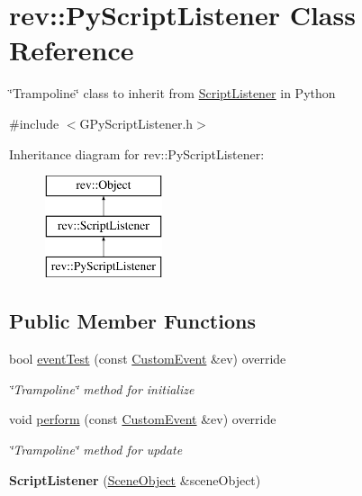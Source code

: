 \hypertarget{classrev_1_1_py_script_listener}{}\section{rev\+::Py\+Script\+Listener Class Reference}
\label{classrev_1_1_py_script_listener}


\char`\"{}\+Trampoline\char`\"{} class to inherit from \mbox{\hyperlink{classrev_1_1_script_listener}{Script\+Listener}} in Python  




{\ttfamily \#include $<$G\+Py\+Script\+Listener.\+h$>$}

Inheritance diagram for rev\+::Py\+Script\+Listener\+:\begin{figure}[H]
\begin{center}
\leavevmode
\includegraphics[height=3.000000cm]{classrev_1_1_py_script_listener}
\end{center}
\end{figure}
\subsection*{Public Member Functions}
\begin{DoxyCompactItemize}
\item 
\mbox{\label{classrev_1_1_py_script_listener_a932749a5461eba4df260c7db1c7f5199}} 
bool \mbox{\hyperlink{classrev_1_1_py_script_listener_a932749a5461eba4df260c7db1c7f5199}{event\+Test}} (const \mbox{\hyperlink{classrev_1_1_custom_event}{Custom\+Event}} \&ev) override
\begin{DoxyCompactList}\small\item\em \char`\"{}\+Trampoline\char`\"{} method for initialize \end{DoxyCompactList}\item 
\mbox{\label{classrev_1_1_py_script_listener_aac70b3c5ae016109bc4e632edd720345}} 
void \mbox{\hyperlink{classrev_1_1_py_script_listener_aac70b3c5ae016109bc4e632edd720345}{perform}} (const \mbox{\hyperlink{classrev_1_1_custom_event}{Custom\+Event}} \&ev) override
\begin{DoxyCompactList}\small\item\em \char`\"{}\+Trampoline\char`\"{} method for update \end{DoxyCompactList}\item 
\mbox{\label{classrev_1_1_py_script_listener_a8a354cfd0b62c9b7ebfd66a9c6c024ca}} 
{\bfseries Script\+Listener} (\mbox{\hyperlink{classrev_1_1_scene_object}{Scene\+Object}} \&scene\+Object)
\end{DoxyCompactItemize}
